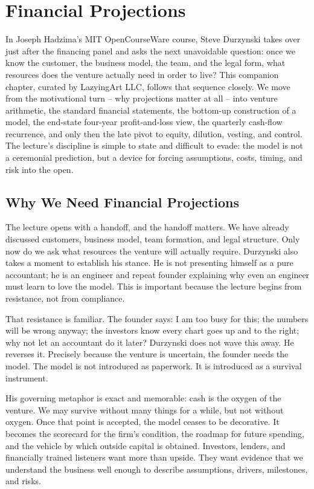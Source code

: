 \chapter{Financial Projections}

In Joseph Hadzima's MIT OpenCourseWare course, Steve Durzynski takes over just after the financing panel and asks the next unavoidable question: once we know the customer, the business model, the team, and the legal form, what resources does the venture actually need in order to live? This companion chapter, curated by LazyingArt LLC, follows that sequence closely. We move from the motivational turn -- why projections matter at all -- into venture arithmetic, the standard financial statements, the bottom-up construction of a model, the end-state four-year profit-and-loss view, the quarterly cash-flow recurrence, and only then the late pivot to equity, dilution, vesting, and control. The lecture's discipline is simple to state and difficult to evade: the model is not a ceremonial prediction, but a device for forcing assumptions, costs, timing, and risk into the open.

\section{Why We Need Financial Projections}

The lecture opens with a handoff, and the handoff matters. We have already discussed customers, business model, team formation, and legal structure. Only now do we ask what resources the venture will actually require. Durzynski also takes a moment to establish his stance. He is not presenting himself as a pure accountant; he is an engineer and repeat founder explaining why even an engineer must learn to love the model. This is important because the lecture begins from resistance, not from compliance.

That resistance is familiar. The founder says: I am too busy for this; the numbers will be wrong anyway; the investors know every chart goes up and to the right; why not let an accountant do it later? Durzynski does not wave this away. He reverses it. Precisely because the venture is uncertain, the founder needs the model. The model is not introduced as paperwork. It is introduced as a survival instrument.

His governing metaphor is exact and memorable: cash is the oxygen of the venture. We may survive without many things for a while, but not without oxygen. Once that point is accepted, the model ceases to be decorative. It becomes the scorecard for the firm's condition, the roadmap for future spending, and the vehicle by which outside capital is obtained. Investors, lenders, and financially trained listeners want more than upside. They want evidence that we understand the business well enough to describe assumptions, drivers, milestones, and risks.

